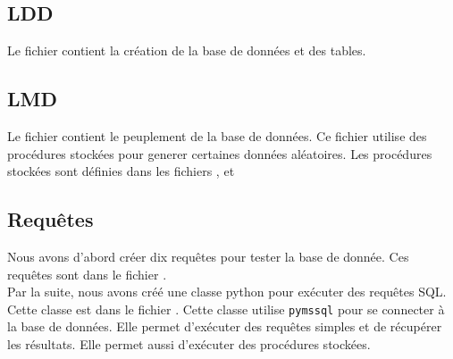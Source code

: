 \documentclass{article}
\newcommand{\n}{\\ [6pt]}
\begin{document}
\subsection{LDD}
Le fichier
\href{https://github.com/ZGaillard/projet_session_2935/blob/main/database/CreateUpdated.sql}{}
contient la création de la base de données et des tables.

\subsection{LMD}
Le fichier
\href{https://github.com/ZGaillard/projet_session_2935/blob/main/database/Populate.sql}{}
contient le peuplement de la base de données. Ce fichier utilise des
procédures stockées pour generer certaines données aléatoires.
Les procédures stockées sont définies dans les fichiers 
  \href{https://github.com/ZGaillard/projet_session_2935/blob/main/database/GenCastingArtistes.sql}{},
  \href{https://github.com/ZGaillard/projet_session_2935/blob/main/database/GenArtisteSport.sql}{}
  et
  \href{https://github.com/ZGaillard/projet_session_2935/blob/main/database/GenArtisteHabit.sql
  }{}

  \newpage
\subsection{Requêtes}
Nous avons d'abord créer dix requêtes pour tester la base de
donnée. Ces requêtes sont dans le fichier
\href{https://github.com/ZGaillard/projet_session_2935/blob/main/database/request.sql}{}.\n


Par la suite, nous avons créé une classe python pour exécuter des
requêtes SQL. Cette classe est dans le fichier \href{
  https://github.com/ZGaillard/projet_session_2935/blob/main/app/DBManager.py}{}.
Cette classe utilise \texttt{pymssql} pour se connecter à la base de
données. Elle permet d'exécuter des requêtes simples et de récupérer
les résultats. Elle permet aussi d'exécuter des procédures stockées.\n
\end{document}

